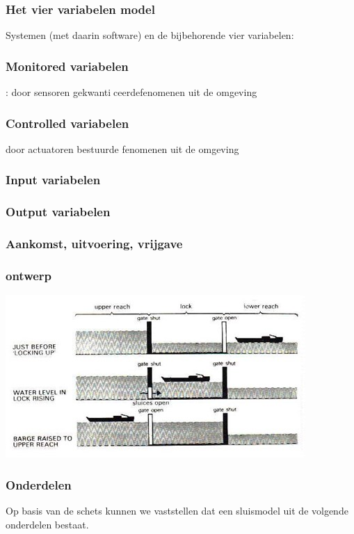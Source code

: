 \subsubsection{Het vier variabelen model}
Systemen (met daarin software) en de bijbehorende vier variabelen:
\subsubsection{Monitored variabelen}
: door sensoren gekwanticeerdefenomenen uit de omgeving
\subsubsection{Controlled variabelen}
door actuatoren bestuurde fenomenen uit de omgeving
\subsubsection{Input variabelen}
\subsubsection{Output variabelen}




\subsubsection{Aankomst, uitvoering, vrijgave}


\subsubsection{ontwerp}

\includegraphics[scale=0.65]{sluismodel.jpg}

\subsubsection{Onderdelen}
Op basis van de schets kunnen we vaststellen dat een sluismodel uit de volgende onderdelen bestaat.

